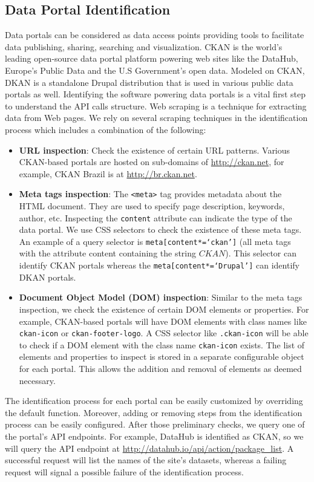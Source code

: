 \documentclass{../../Tools/LaTEX/sig-alternate}
\begin{document}
\subsection{Data Portal Identification}
Data portals can be considered as data access points providing tools to facilitate data publishing, sharing, searching and visualization. CKAN is the world's leading open-source data portal platform powering web sites like the DataHub, Europe's Public Data and the U.S Government's open data. Modeled on CKAN, DKAN is a standalone Drupal distribution that is used in various public data portals as well. Identifying the software powering data portals is a vital first step to understand the API calls structure. Web scraping is a technique for extracting data from Web pages. We rely on several scraping techniques in the identification process which includes a combination of the following:
\begin{itemize}
  \item \textbf{URL inspection}: Check the existence of certain URL patterns. Various CKAN-based portals are hosted on sub-domains of \url{http://ckan.net}, for example, CKAN Brazil is at \url{http://br.ckan.net}.
  \item \textbf{Meta tags inspection}: The \texttt{<meta>} tag provides metadata about the HTML document. They are used to specify page description, keywords, author, etc. Inspecting the \texttt{content} attribute can indicate the type of the data portal. We use CSS selectors to check the existence of these meta tags. An example of a query selector is \texttt{meta[content*=`ckan']} (all meta tags with the attribute content containing the string $CKAN$). This selector can identify CKAN portals whereas the \texttt{meta[content*=`Drupal']} can identify DKAN portals.
  \item \textbf{Document Object Model (DOM) inspection}: Similar to the meta tags inspection, we check the existence of certain DOM elements or properties. For example, CKAN-based portals will have DOM elements with class names like \texttt{ckan-icon} or \texttt{ckan-footer-logo}. A CSS selector like \texttt{.ckan-icon} will be able to check if a DOM element with the class name \texttt{ckan-icon} exists. The list of elements and properties to inspect is stored in a separate configurable object for each portal. This allows the addition and removal of elements as deemed necessary.
\end{itemize}

The identification process for each portal can be easily customized by overriding the default function. Moreover, adding or removing steps from the identification process can be easily configured. After those preliminary checks, we query one of the portal's API endpoints. For example, DataHub is identified as CKAN, so we will query the API endpoint at \url{http://datahub.io/api/action/package_list}. A successful request will list the names of the site's datasets, whereas a failing request will signal a possible failure of the identification process.
\end{document}
